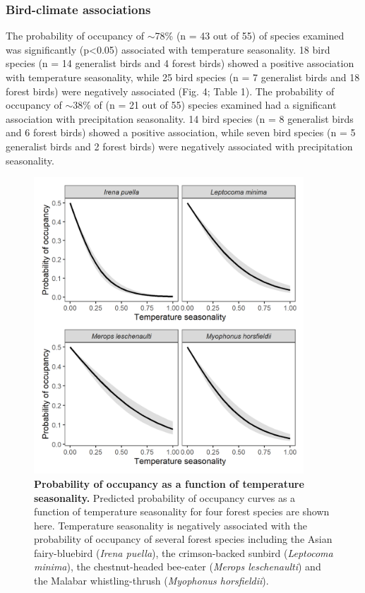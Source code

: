 \subsubsection*{Bird-climate associations}

The probability of occupancy of $\sim$78\% (n = 43 out of 55) of species examined was significantly (p<0.05) associated with temperature seasonality.
18 bird species (n = 14 generalist birds and 4 forest birds) showed a positive association with temperature seasonality, while 25 bird species (n = 7 generalist birds and 18 forest birds) were negatively associated (Fig.
4; Table 1).
The probability of occupancy of $\sim$38\% of (n = 21 out of 55) species examined had a significant association with precipitation seasonality.
14 bird species (n = 8 generalist birds and 6 forest birds) showed a positive association, while seven bird species (n = 5 generalist birds and 2 forest birds) were negatively associated with precipitation seasonality.

\begin{figure}[t!]
    \centering
    \includegraphics[width=0.9\textwidth]{figures/hillybirds/fig_05.png}
    \caption{
        \textbf{Probability of occupancy as a function of temperature seasonality.}
        Predicted probability of occupancy curves as a function of temperature seasonality for four forest species are shown here. 
        Temperature seasonality is negatively associated with the probability of occupancy of several forest species including the Asian fairy-bluebird (\textit{Irena puella}), the crimson-backed sunbird (\textit{Leptocoma minima}), the chestnut-headed bee-eater (\textit{Merops leschenaulti}) and the Malabar whistling-thrush (\textit{Myophonus horsfieldii}).
    }
    \label{hilly_fig_05}
\end{figure}

